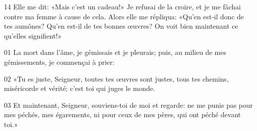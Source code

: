 14 Elle me dit: «Mais c’est un cadeau!» Je refusai de la croire, et je me fâchai contre ma femme à cause de cela. Alors elle me répliqua: «Qu’en est-il donc de tes aumônes? Qu’en est-il de tes bonnes œuvres? On voit bien maintenant ce qu’elles signifient!»

01 La mort dans l’âme, je gémissais et je pleurais; puis, au milieu de mes gémissements, je commençai à prier:

02 «Tu es juste, Seigneur, toutes tes œuvres sont justes, tous tes chemins, miséricorde et vérité; c’est toi qui juges le monde.

03 Et maintenant, Seigneur, souviens-toi de moi et regarde: ne me punis pas pour mes péchés, mes égarements, ni pour ceux de mes pères, qui ont péché devant toi.»
